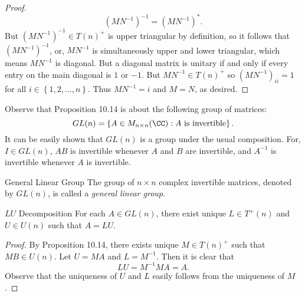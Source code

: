 \documentclass[linearalgebra]{subfiles}
\begin{document}
\begin{proof}
\begin{equation*}
            \left( MN^{-1} \right) ^{-1} = \left( MN^{-1} \right) ^*.
        \end{equation*}
        But $\left( MN^{-1} \right) ^{-1}\in T(n)^+$ is upper triangular by definition, so it follows that $\left( MN^{-1} \right) ^{-1}$, or, $MN^{-1}$ is simultaneously upper and lower triangular, which means $MN^{-1}$ is diagonal. But a diagonal matrix is unitary if and only if every entry on the main diagonal is $1$ or $-1$. But $MN^{-1}\in T(n)^+$ so $\left( MN^{-1} \right) _{ii} = 1$ for all $i\in\left\lbrace 1,2,\ldots,n \right\rbrace$. Thus $MN^{-1} = i$ and $M=N$, as desired.
    \end{proof}

    \begin{remark}
        Observe that Proposition 10.14 is about the following group of matrices:
        \begin{equation*}
            GL(n) = \left\lbrace A\in M_{n\times n}(\CC): A\text{ is invertible} \right\rbrace .
        \end{equation*}
        It can be easily shown that $GL(n)$ is a group under the usual composition. For, $I\in GL(n)$, $AB$ is invertible whenever $A$ and $B$ are invertible, and $A^{-1}$ is invertible whenever $A$ is invertible.
    \end{remark}

    \begin{definition}{General Linear Group}{}
        The group of $n\times n$ complex invertible matrices, denoted by $GL(n)$, is called a \emph{general linear group}.
    \end{definition}

    \begin{cor}{$LU$ Decomposition}
        For each $A\in GL(n)$, there exist unique $L\in T^+(n)$ and $U\in U(n)$ such that $A=LU$.
    \end{cor}	

    \begin{proof}
        By Proposition 10.14, there exists unique $M\in T(n)^+$ such that $MB\in U(n)$. Let $U=MA$ and $L=M^{-1}$. Then it is clear that
        \begin{equation*}
            LU = M^{-1}MA = A.
        \end{equation*}
        Observe that the uniqueness of $U$ and $L$ easily follows from the uniqueness of $M$.
    \end{proof}
\end{document}
